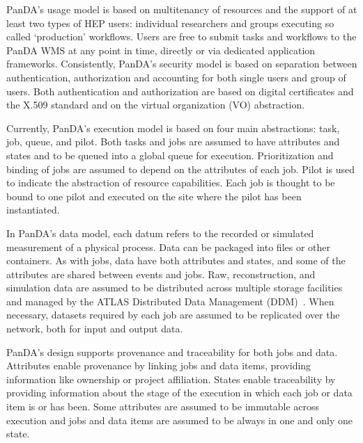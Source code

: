 PanDA's usage model is based on multitenancy of resources and the support of at
least two types of HEP users: individual researchers and groups executing so
called `production' workflows. Users are free to submit tasks and workflows to
the PanDA WMS at any point in time, directly or via dedicated application
frameworks. Consistently, PanDA's security model is based on separation between
authentication, authorization and accounting for both single users and group of
users. Both authentication and authorization are based on digital certificates
and the X.509 standard and on the virtual organization (VO) abstraction.


Currently, PanDA's execution model is based on four main abstractions: task,
job, queue, and pilot. Both tasks and jobs are assumed to have attributes and
states and to be queued into a global queue for execution. Prioritization and
binding of jobs are assumed to depend on the attributes of each job. Pilot is
used to indicate the abstraction of resource capabilities. Each job is thought
to be bound to one pilot and executed on the site where the pilot has been
instantiated.

In PanDA's data model, each
datum refers to the recorded or simulated measurement of a physical
process.
Data can be packaged into files or other containers. As with jobs, data
have both attributes and states, and some of the attributes are shared between
events and jobs. Raw, reconstruction, and simulation data are assumed to be
distributed across multiple storage facilities and managed by the ATLAS
Distributed Data Management (DDM)~\cite{garonne2012atlas}. When necessary,
datasets required by each job are assumed to be replicated over the network,
both for input and output data.

PanDA's design supports provenance and traceability for both jobs and data.
Attributes enable provenance by linking jobs and data items, providing
information like ownership or project affiliation. States enable traceability by
providing information about the stage of the execution in which each job or data
item is or has been. Some attributes are assumed to be immutable across
execution and jobs and data items are assumed to be always in one and only one
state.



